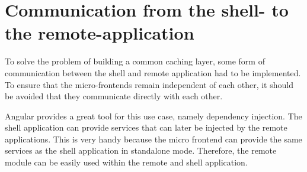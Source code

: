 \documentclass[MSE,Master,english]{twbook}%
\begin{document}



\fi

\section{Communication from the shell- to the remote-application}\label{section:methods:communication-shell-remote}

To solve the problem of building a common caching layer, some form of communication between the shell and remote application had to be implemented. To ensure that the micro-frontends remain independent of each other, it should be avoided that they communicate directly with each other.

Angular provides a great tool for this use case, namely dependency injection. The shell application can provide services that can later be injected by the remote applications. This is very handy because the micro frontend can provide the same services as the shell application in standalone mode. Therefore, the remote module can be easily used within the remote and shell application.
\end{document}
